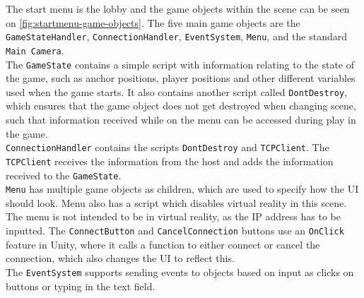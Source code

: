 The start menu is the lobby and the game objects within the scene can be seen on \autoref{fig:startmenu-game-objects}.
The five main game objects are the \texttt{GameStateHandler}, \texttt{ConnectionHandler}, \texttt{EventSystem}, \texttt{Menu}, and the standard \texttt{Main Camera}.
\\
The \texttt{GameState} contains a simple script with information relating to the state of the game, such as anchor positions, player positions and other different variables used when the game starts.
It also contains another script called \texttt{DontDestroy}, which ensures that the game object does not get destroyed when changing scene, such that information received while on the menu can be accessed during play in the game.
\\
\texttt{ConnectionHandler} contains the scripts \texttt{DontDestroy} and \texttt{TCPClient}.
The \texttt{TCPClient} receives the information from the host and adds the information received to the \texttt{GameState}.
\\
\texttt{Menu} has multiple game objects as children, which are used to specify how the UI should look.
Menu also has a script which disables virtual reality in this scene.
The menu is not intended to be in virtual reality, as the IP address has to be inputted.
The \texttt{ConnectButton} and \texttt{CancelConnection} buttons use an \texttt{OnClick} feature in Unity, where it calls a function to either connect or cancel the connection, which also changes the UI to reflect this.
\\
The \texttt{EventSystem} supports sending events to objects based on input as clicks on buttons or typing in the text field.

